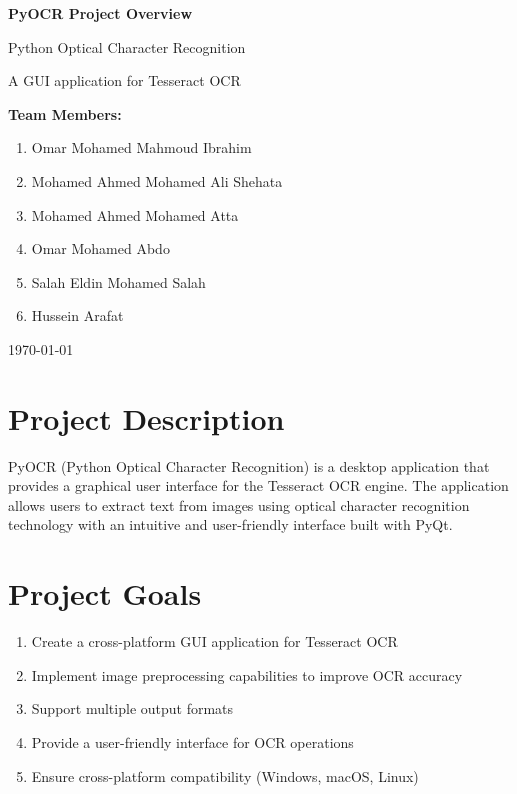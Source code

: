 \documentclass[12pt]{article}
\begin{document}
\begin{titlepage}
    \centering
    \vspace*{1cm}
    {\Huge\textbf{PyOCR Project Overview}\par}
    \vspace{1.5cm}
    {\Large Python Optical Character Recognition\par}
    \vspace{2cm}
    {\large A GUI application for Tesseract OCR\par}
    \vspace{1.5cm}
    {\large\textbf{Team Members:}\par}
    \vspace{0.5cm}
    {\large
    \begin{enumerate}[label=\arabic*.]
        \item Omar Mohamed Mahmoud Ibrahim
        \item Mohamed Ahmed Mohamed Ali Shehata
        \item Mohamed Ahmed Mohamed Atta
        \item Omar Mohamed Abdo
        \item Salah Eldin Mohamed Salah
        \item Hussein Arafat
    \end{enumerate}\par}
    \vfill
    {\large \today\par}
\end{titlepage}

\tableofcontents
\newpage

\section{Project Description}
PyOCR (Python Optical Character Recognition) is a desktop application that provides a graphical user interface for the Tesseract OCR engine. The application allows users to extract text from images using optical character recognition technology with an intuitive and user-friendly interface built with PyQt.

\section{Project Goals}
\begin{enumerate}
    \item Create a cross-platform GUI application for Tesseract OCR
    \item Implement image preprocessing capabilities to improve OCR accuracy
    \item Support multiple output formats
    \item Provide a user-friendly interface for OCR operations
    \item Ensure cross-platform compatibility (Windows, macOS, Linux)
\end{enumerate}
\end{document}
